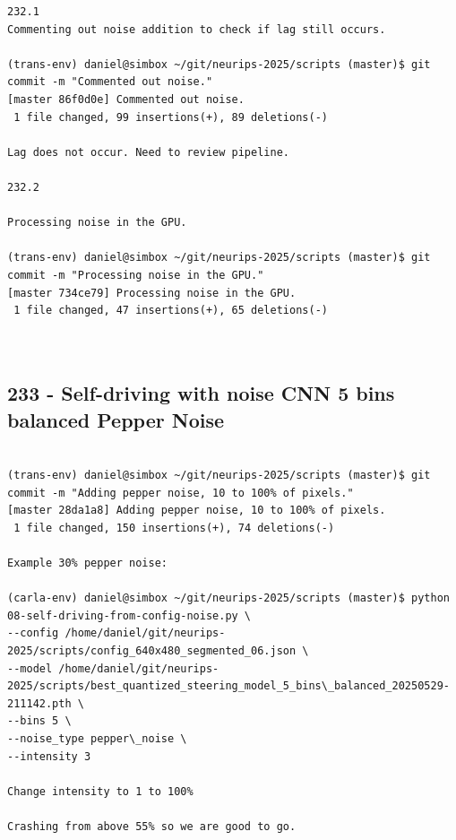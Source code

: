 \begin{verbatim}
232.1 
Commenting out noise addition to check if lag still occurs.

(trans-env) daniel@simbox ~/git/neurips-2025/scripts (master)$ git commit -m "Commented out noise."
[master 86f0d0e] Commented out noise.
 1 file changed, 99 insertions(+), 89 deletions(-)
 
Lag does not occur. Need to review pipeline.

232.2

Processing noise in the GPU.

(trans-env) daniel@simbox ~/git/neurips-2025/scripts (master)$ git commit -m "Processing noise in the GPU."
[master 734ce79] Processing noise in the GPU.
 1 file changed, 47 insertions(+), 65 deletions(-)



\end{verbatim}


\subsection{233 - Self-driving with noise CNN 5 bins balanced Pepper Noise}
\label{app_res:233}

\begin{verbatim}

(trans-env) daniel@simbox ~/git/neurips-2025/scripts (master)$ git commit -m "Adding pepper noise, 10 to 100% of pixels."
[master 28da1a8] Adding pepper noise, 10 to 100% of pixels.
 1 file changed, 150 insertions(+), 74 deletions(-)

Example 30% pepper noise:

(carla-env) daniel@simbox ~/git/neurips-2025/scripts (master)$ python 08-self-driving-from-config-noise.py \
--config /home/daniel/git/neurips-2025/scripts/config_640x480_segmented_06.json \
--model /home/daniel/git/neurips-2025/scripts/best_quantized_steering_model_5_bins\_balanced_20250529-211142.pth \
--bins 5 \
--noise_type pepper\_noise \
--intensity 3

Change intensity to 1 to 100%

Crashing from above 55% so we are good to go.

\end{verbatim}

